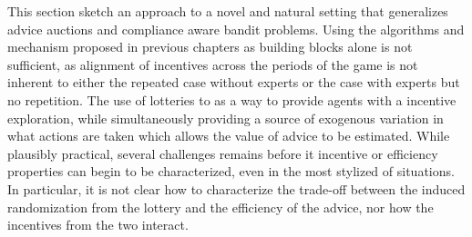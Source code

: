 This section sketch an approach to a novel and natural setting that generalizes advice auctions and compliance aware bandit problems.
Using the algorithms and mechanism proposed in  previous chapters as building blocks alone is not sufficient, as alignment of incentives across the periods of the game is not inherent to either the repeated case without experts or the case with experts but no repetition. The use of lotteries to as a way to provide agents with a incentive exploration, while simultaneously providing a source of exogenous variation in what actions are taken which allows the value of advice to be estimated. 
While plausibly practical, several challenges remains before it  incentive or efficiency properties can begin to be characterized, even in the most stylized of situations. 
In particular, it is not clear how to characterize the trade-off between the induced randomization from the lottery and the efficiency of the advice, nor how the incentives from the two interact. 



